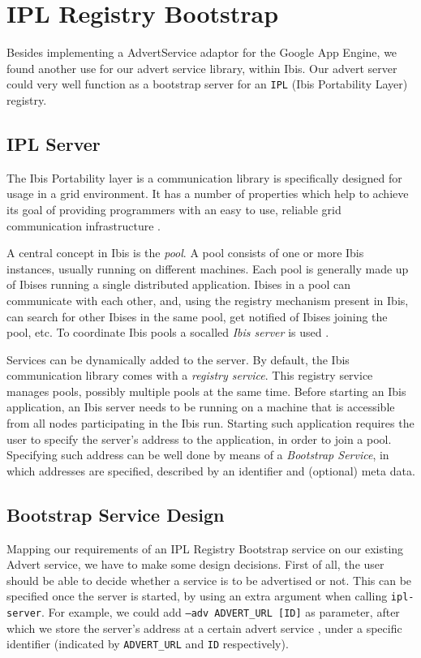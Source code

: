 \section{IPL Registry Bootstrap}
\label{ipl}
Besides implementing a AdvertService adaptor for the Google App Engine, we
found another use for our advert service library, within Ibis. Our advert
server could very well function as a bootstrap server for an \texttt{IPL} (Ibis
Portability Layer) \cite{ipl-www} registry.

\subsection{IPL Server}
The Ibis Portability layer is a communication library is specifically
designed for usage in a grid environment. It has a number of properties which
help to achieve its goal of providing programmers with an easy to use, reliable
grid communication infrastructure \cite{ipl-www}.

A central concept in Ibis is the \emph{pool}. A pool consists of one or more Ibis
instances, usually running on different machines. Each pool is generally made up
of Ibises running a single distributed application. Ibises in a pool can
communicate with each other, and, using the registry mechanism present in Ibis,
can search for other Ibises in the same pool, get notified of Ibises joining the
pool, etc. To coordinate Ibis pools a socalled \emph{Ibis server} is used
\cite{ipl-usersguide}.

Services can be dynamically added to the server. By default, the Ibis
communication library comes with a \emph{registry service}. This registry
service manages pools, possibly multiple pools at the same time. Before starting
an Ibis application, an Ibis server needs to be running on a machine that is
accessible from all nodes participating in the Ibis run. Starting such
application requires the user to specify the server's address to the
application, in order to join a pool. Specifying such address can be well done
by means of a \emph{Bootstrap Service}, in which addresses are specified,
described by an identifier and (optional) meta data.

\subsection{Bootstrap Service Design}
Mapping our requirements of an IPL Registry Bootstrap service on our existing
Advert service, we have to make some design decisions. First of all, the user
should be able to decide whether a service is to be advertised or not. This can
be specified once the server is started, by using an extra argument when
calling \texttt{ipl-server}. For example, we could add \texttt{--adv ADVERT\_URL
[ID]} as parameter, after which we store the server's address at a certain
advert service , under a specific identifier (indicated by \texttt{ADVERT\_URL}
and \texttt{ID} respectively).

